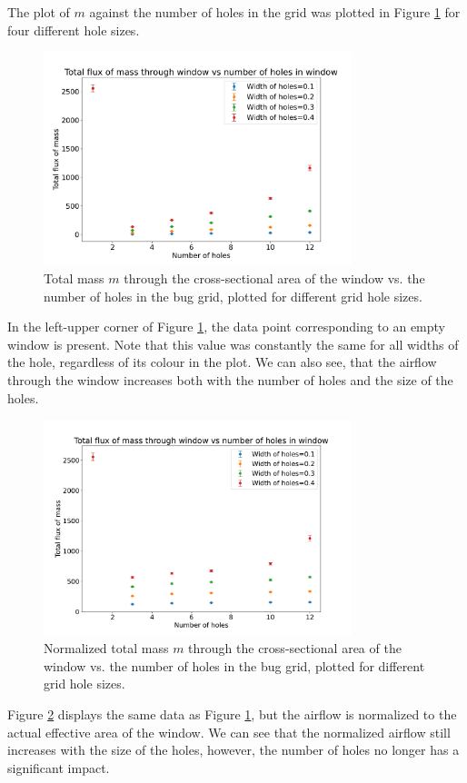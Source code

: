  The plot of $m$ against the number of holes in the grid was plotted in Figure \ref{fig: flow_rate} for four different hole sizes.
\begin{figure}[H]
    \centering
    \includegraphics[width=0.8\textwidth]{figures/flux_vs_holes.pdf}
    \caption{Total mass $m$ through the cross-sectional area of the window vs. the number of holes in the bug grid, plotted for different grid hole sizes.}
    \label{fig: flow_rate}
\end{figure}
In the left-upper corner of Figure \ref{fig: flow_rate}, the data point corresponding to an empty window is present. Note that this value was constantly the same for all widths of the hole, regardless of its colour in the plot. We can also see, that the airflow through the window increases both with the number of holes and the size of the holes. \\

\begin{figure}[H]
    \centering
    \includegraphics[width=0.8\textwidth]{figures/flux_vs_holes_norm.pdf}
    \caption{Normalized total mass $m$ through the cross-sectional area of the window vs. the number of holes in the bug grid, plotted for different grid hole sizes.}
    \label{fig: flow_rate_norm}
\end{figure}
Figure \ref{fig: flow_rate_norm} displays the same data as Figure \ref{fig: flow_rate}, but the airflow is normalized to the actual effective area of the window. We can see that the normalized airflow still increases with the size of the holes, however, the number of holes no longer has a significant impact.


